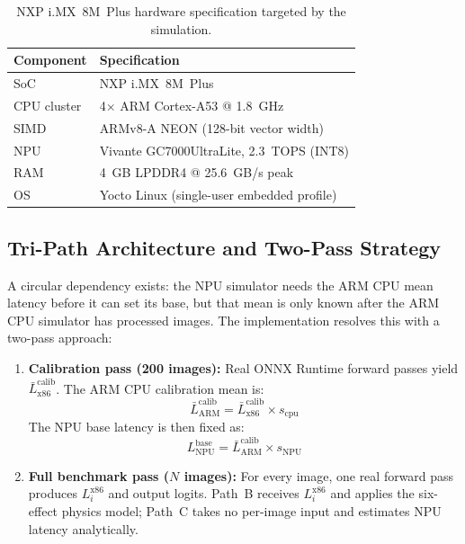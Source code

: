 \begin{table}[H]
\centering
\caption{NXP i.MX~8M~Plus hardware specification targeted by the simulation.}
\label{tab:imx8_spec}
\begin{tabular}{ll}
\toprule
\textbf{Component} & \textbf{Specification} \\
\midrule
SoC         & NXP i.MX~8M~Plus \\
CPU cluster & 4$\times$ ARM Cortex-A53 @ 1.8~GHz \\
SIMD        & ARMv8-A NEON (128-bit vector width) \\
NPU         & Vivante GC7000UltraLite, 2.3~TOPS (INT8) \\
RAM         & 4~GB LPDDR4 @ 25.6~GB/s peak \\
OS          & Yocto Linux (single-user embedded profile) \\
\bottomrule
\end{tabular}
\end{table}

\subsection{Tri-Path Architecture and Two-Pass Strategy}

A circular dependency exists: the NPU simulator needs the ARM CPU mean latency
before it can set its base, but that mean is only known after the ARM CPU
simulator has processed images. The implementation resolves this with a
two-pass approach:

\begin{enumerate}[itemsep=1pt, topsep=3pt]
    \item \textbf{Calibration pass (200 images):} Real ONNX Runtime forward
          passes yield $\bar{L}_{\text{x86}}^{\text{calib}}$. The ARM CPU
          calibration mean is:
          \begin{equation}
              \bar{L}_{\text{ARM}}^{\text{calib}}
              = \bar{L}_{\text{x86}}^{\text{calib}} \times s_{\text{cpu}}
          \end{equation}
          The NPU base latency is then fixed as:
          \begin{equation}
              L_{\text{NPU}}^{\text{base}}
              = \bar{L}_{\text{ARM}}^{\text{calib}} \times s_{\text{NPU}}
          \end{equation}

    \item \textbf{Full benchmark pass ($N$ images):} For every image, one
          real forward pass produces $L_i^{\text{x86}}$ and output logits.
          Path~B receives $L_i^{\text{x86}}$ and applies the six-effect
          physics model; Path~C takes no per-image input and estimates NPU
          latency analytically.
\end{enumerate}

